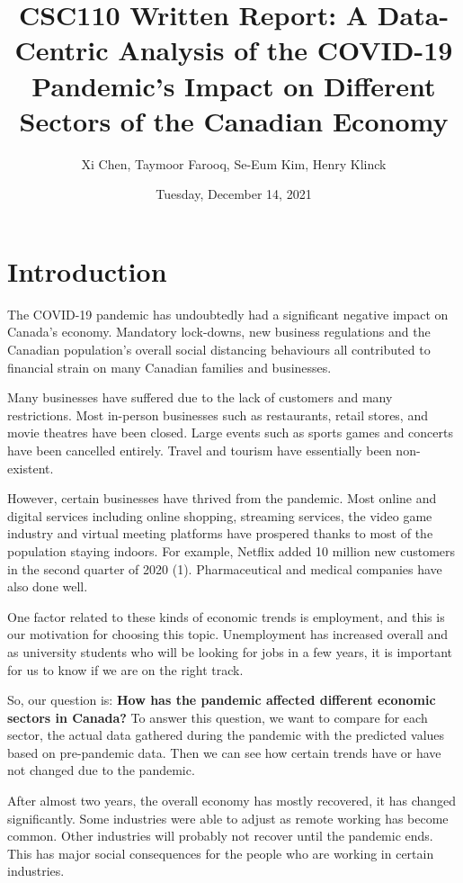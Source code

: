 \documentclass[fontsize=11pt]{article}
\title{CSC110 Written Report: A Data-Centric Analysis of the COVID-19 Pandemic's Impact on Different Sectors of the Canadian Economy}
\author{Xi Chen, Taymoor Farooq, Se-Eum Kim, Henry Klinck}
\date{Tuesday, December 14, 2021}
\begin{document}
\maketitle

\section{Introduction}

The COVID-19 pandemic has undoubtedly had a significant negative impact on Canada's economy. Mandatory lock-downs, new business regulations and the Canadian population's overall social distancing behaviours all contributed to financial strain on many Canadian families and businesses.

Many businesses have suffered due to the lack of customers and many restrictions. Most in-person businesses such as restaurants, retail stores, and movie theatres have been closed. Large events such as sports games and concerts have been cancelled entirely. Travel and tourism have essentially been non-existent.

However, certain businesses have thrived from the pandemic. Most online and digital services including online shopping, streaming services, the video game industry and virtual meeting platforms have prospered thanks to most of the population staying indoors. For example, Netflix added 10 million new customers in the second quarter of 2020 (1). Pharmaceutical and medical companies have also done well.

One factor related to these kinds of economic trends is employment, and this is our motivation for choosing this topic. Unemployment has increased overall and as university students who will be looking for jobs in a few years, it is important for us to know if we are on the right track. 

So, our question is: \textbf{How has the pandemic affected different economic sectors in Canada?} To answer this question, we want to compare for each sector, the actual data gathered during the pandemic with the predicted values based on pre-pandemic data. Then we can see how certain trends have or have not changed due to the pandemic. 

After almost two years, the overall economy has mostly recovered, it has changed significantly. Some industries were able to adjust as remote working has become common. Other industries will probably not recover until the pandemic ends. This has major social consequences for the people who are working in certain industries.
\end{document}

